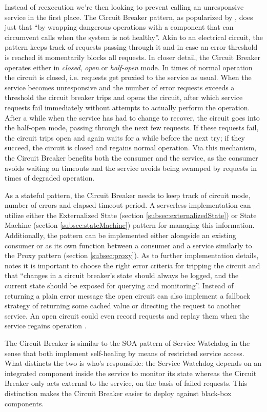 Instead of reexecution we're then looking to prevent calling an unresponsive service in the first place. The Circuit Breaker pattern, as popularized by \textcite{nygard07releaseIt}, does just that ``by wrapping dangerous operations with a component that can circumvent calls when the system is not healthy''. Akin to an electrical circuit, the pattern keeps track of requests passing through it and in case an error threshold is reached it momentarily blocks all requests. In closer detail, the Circuit Breaker operates either in \textit{closed}, \textit{open} or \textit{half-open} mode. In times of normal operation the circuit is closed, i.e. requests get proxied to the service as usual. When the service becomes unresponsive and the number of error requests exceeds a threshold the circuit breaker trips and opens the circuit, after which service requests fail immediately without attempts to actually perform the operation. After a while when the service has had to change to recover, the circuit goes into the half-open mode, passing through the next few requests. If these requests fail, the circuit trips open and again waits for a while before the next try; if they succeed, the circuit is closed and regains normal operation. Via this mechanism, the Circuit Breaker benefits both the consumer and the service, as the consumer avoids waiting on timeouts and the service avoids being swamped by requests in times of degraded operation.

As a stateful pattern, the Circuit Breaker needs to keep track of circuit mode, number of errors and elapsed timeout period. A serverless implementation can utilize either the Externalized State (section \ref{subsec:externalizedState}) or State Machine (section \ref{subsec:stateMachine}) pattern for managing this information. Additionally, the pattern can be implemented either alongside an existing consumer or as its own function between a consumer and a service similarly to the Proxy pattern (section \ref{subsec:proxy}). As to further implementation details, \textcite{nygard07releaseIt} notes it is important to choose the right error criteria for tripping the circuit and that ``changes in a circuit breaker’s state should always be logged, and the current state should be exposed for querying and monitoring''. Instead of returning a plain error message the open circuit can also implement a fallback strategy of returning some cached value or directing the request to another service. An open circuit could even record requests and replay them when the service regains operation \parencite{microsoft18cloudPatterns}.

The Circuit Breaker is similar to the SOA pattern of Service Watchdog \parencite{rotem12soa} in the sense that both implement self-healing by means of restricted service access. What distincts the two is who's responsible: the Service Watchdog depends on an integrated component inside the service to monitor its state whereas the Circuit Breaker only acts external to the service, on the basis of failed requests. This distinction makes the Circuit Breaker easier to deploy against black-box components.
